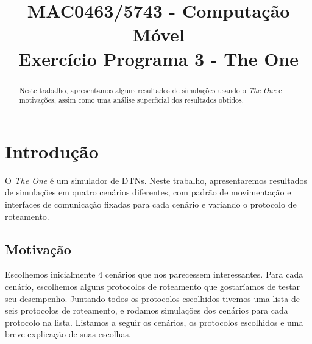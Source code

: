 \documentclass[conference]{IEEEtran}
\begin{document}
\title{MAC0463/5743 - Computação Móvel \\ Exercício Programa 3 - The One}


\author{
\and
{}
}


\maketitle

\begin{abstract}
    Neste trabalho, apresentamos alguns resultados de simulações usando
    o \emph{The One} e motivações, assim como uma análise superficial dos
    resultados obtidos.
\end{abstract}

\IEEEpeerreviewmaketitle


\section{Introdução}
O \emph{The One} é um simulador de DTNs. Neste trabalho, apresentaremos resultados de simulações em quatro cenários diferentes, com padrão de movimentação e interfaces de comunicação fixadas para cada cenário e variando o protocolo de roteamento.

\subsection{Motivação}
\label{sec:intro:motivacao}
Escolhemos inicialmente 4 cenários que nos parecessem interessantes. Para cada cenário, escolhemos alguns protocolos de roteamento que gostaríamos de testar seu desempenho. Juntando todos os protocolos escolhidos tivemos uma lista de seis protocolos de roteamento, e rodamos simulações dos cenários para cada protocolo na lista. Listamos a seguir os cenários, os protocolos escolhidos e uma breve explicação de suas escolhas.
\end{document}

